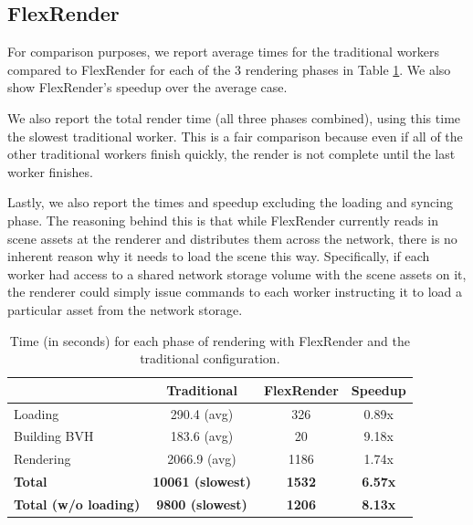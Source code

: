 \documentclass[12pt]{ucthesis}
\begin{document}
\subsection{FlexRender}
\label{toystoreflexrender}

For comparison purposes, we report average times for the traditional workers
compared to FlexRender for each of the 3 rendering phases in Table
\ref{tb:flexrendertimes}. We also show FlexRender's speedup over the average case.

We also report the total render time (all three phases combined), using this
time the slowest traditional worker. This is a fair comparison because even if
all of the other traditional workers finish quickly, the render is not complete
until the last worker finishes.

Lastly, we also report the times and speedup excluding the loading and syncing
phase. The reasoning behind this is that while FlexRender currently reads in
scene assets at the renderer and distributes them across the network, there is
no inherent reason why it needs to load the scene this way. Specifically,
if each worker had access to a shared network storage volume with the scene
assets on it, the renderer could simply issue commands to each worker
instructing it to load a particular asset from the network storage.

\begin{table}
\begin{center}
\begin{tabular}{|l||c|c|c|}
    \hline
    & Traditional & FlexRender & Speedup \\
    \hline
    \hline
    Loading & 290.4 (avg) & 326 & 0.89x \\
    \hline
    Building BVH & 183.6 (avg) & 20 & 9.18x \\
    \hline
    Rendering & 2066.9 (avg) & 1186 & 1.74x \\
    \hline
    \hline
    \textbf{Total} & \textbf{10061 (slowest)} & \textbf{1532} & \textbf{6.57x} \\
    \hline
    \textbf{Total (w/o loading)} & \textbf{9800 (slowest)} & \textbf{1206} & \textbf{8.13x} \\
    \hline
\end{tabular}
\caption{Time (in seconds) for each phase of rendering with FlexRender and the traditional configuration.}
\label{tb:flexrendertimes}
\end{center}
\end{table}
\end{document}

